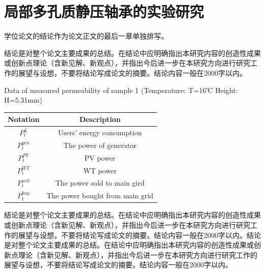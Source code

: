 \documentclass[a4paper, twoside, openany]{NCEPUDoctor}
\begin{document}
  \chapter{局部多孔质静压轴承的实验研究}


  学位论文的结论作为论文正文的最后一章单独排写。

  结论是对整个论文主要成果的总结。在结论中应明确指出本研究内容的创造性成果或创新点理论（含新见解、新观点），并指出今后进一步在本研究方向进行研究工作的展望与设想，不要将结论写成论文的摘要。结论内容一般在2000字以内。

  \begin{table}[htbp]
  \centering
  {Data of measured permeability of sample 1 (Temperature: T=16℃ Height: H=5.31mm)} %
  \label{notation} %

  \begin{tabularx}{\textwidth}{ C{0.4} C{0.6}}
      \toprule[1.5pt]
          Notation & Description   \\
      \midrule[1pt]
          $P_{t}^L$ & Users' energy consumption \\
          $P_t^{gen}$ & The power of generator\\
          $P_t^{PV}$ & PV power \\
          $P_t^{WT}$ & WT power  \\
          $P_t^{sell}$ & The power sold to main gird \\
          $P_t^{buy}$ & The power bought from main grid\\
      \bottomrule[1.5pt]
  \end{tabularx}
  \end{table}

  结论是对整个论文主要成果的总结。在结论中应明确指出本研究内容的创造性成果或创新点理论（含新见解、新观点），并指出今后进一步在本研究方向进行研究工作的展望与设想，不要将结论写成论文的摘要。结论内容一般在2000字以内。结论是对整个论文主要成果的总结。在结论中应明确指出本研究内容的创造性成果或创新点理论（含新见解、新观点），并指出今后进一步在本研究方向进行研究工作的展望与设想，不要将结论写成论文的摘要。结论内容一般在2000字以内。
\end{document}
